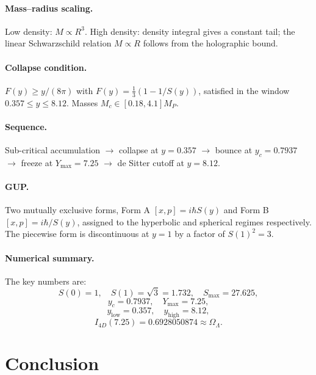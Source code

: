 \documentclass[a4paper,1pt,oneside,openany]{book}
\begin{document}
\paragraph{Mass--radius scaling.}
Low density: $M\propto R^{3}$. High density: density integral 
gives a constant tail; the linear Schwarzschild relation 
$M\propto R$ follows from the holographic bound.

\paragraph{Collapse condition.}
$F(y)\geq y/(8\pi)$ with 
$F(y)=\frac{1}{3}(1-1/S(y))$, satisfied in the window 
$0.357\leq y\leq 8.12$. Masses $M_{c}\in[0.18,4.1]M_{P}$.

\paragraph{Sequence.}
Sub-critical accumulation $\to$ collapse at $y=0.357$ $\to$ 
bounce at $y_{c}=0.7937$ $\to$ freeze at $Y_{\max}=7.25$ $\to$ 
de Sitter cutoff at $y=8.12$.

\paragraph{GUP.}
Two mutually exclusive forms, Form A 
$[x,p]=i\hbar S(y)$ and Form B $[x,p]=i\hbar/S(y)$, assigned 
to the hyperbolic and spherical regimes respectively. The 
piecewise form is discontinuous at $y=1$ by a factor of 
$S(1)^{2}=3$.

\paragraph{Numerical summary.}
The key numbers are:
\begin{equation}
S(0)=1,\quad S(1)=\sqrt{3}=1.732,\quad S_{\max}=27.625,
\end{equation}
\begin{equation}
y_{c}=0.7937,\quad Y_{\max}=7.25,
\end{equation}
\begin{equation}
y_{\text{low}}=0.357,\quad y_{\text{high}}=8.12,
\end{equation}
\begin{equation}
I_{4D}(7.25)=0.6928050874\approx\Omega_{\Lambda}.
\end{equation}

\section{Conclusion}
\end{document}
